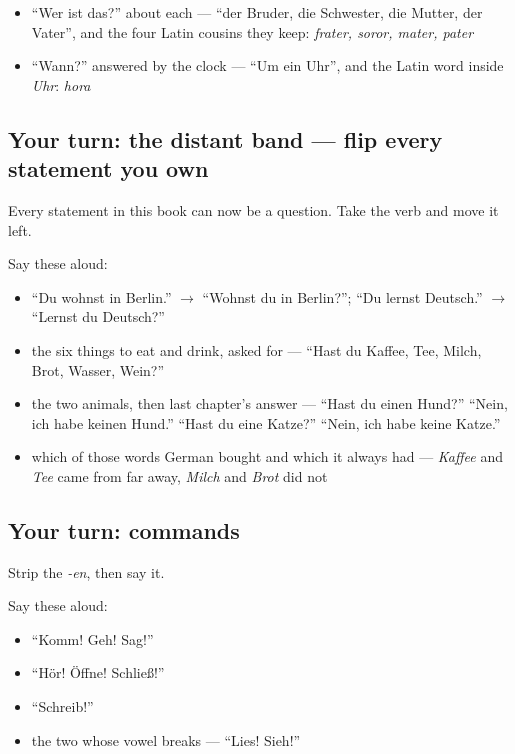 \begin{itemize}
\raggedright
  \item \textquotedblleft{}Wer ist das?\textquotedblright{} about each — \textquotedblleft{}der Bruder, die Schwester, die Mutter, der Vater\textquotedblright{}, and the four Latin cousins they keep: \emph{frater, soror, mater, pater}
  \item \textquotedblleft{}Wann?\textquotedblright{} answered by the clock — \textquotedblleft{}Um ein Uhr\textquotedblright{}, and the Latin word inside \emph{Uhr}: \emph{hora}
\end{itemize}

\subsection*{Your turn: the distant band — flip every statement you own}
Every statement in this book can now be a question. Take the verb and move it left.

Say these aloud:

\begin{itemize}
\raggedright
  \item \textquotedblleft{}Du wohnst in Berlin.\textquotedblright{} $\to$ \textquotedblleft{}Wohnst du in Berlin?\textquotedblright{}; \textquotedblleft{}Du lernst Deutsch.\textquotedblright{} $\to$ \textquotedblleft{}Lernst du Deutsch?\textquotedblright{}
  \item the six things to eat and drink, asked for — \textquotedblleft{}Hast du Kaffee, Tee, Milch, Brot, Wasser, Wein?\textquotedblright{}
  \item the two animals, then last chapter's answer — \textquotedblleft{}Hast du einen Hund?\textquotedblright{} \textquotedblleft{}Nein, ich habe keinen Hund.\textquotedblright{} \textquotedblleft{}Hast du eine Katze?\textquotedblright{} \textquotedblleft{}Nein, ich habe keine Katze.\textquotedblright{}
  \item which of those words German bought and which it always had — \emph{Kaffee} and \emph{Tee} came from far away, \emph{Milch} and \emph{Brot} did not
\end{itemize}

\subsection*{Your turn: commands}
Strip the \emph{-en}, then say it.

Say these aloud:

\begin{itemize}
\raggedright
  \item \textquotedblleft{}Komm! Geh! Sag!\textquotedblright{}
  \item \textquotedblleft{}Hör! Öffne! Schließ!\textquotedblright{}
  \item \textquotedblleft{}Schreib!\textquotedblright{}
  \item the two whose vowel breaks — \textquotedblleft{}Lies! Sieh!\textquotedblright{}
\end{itemize}

